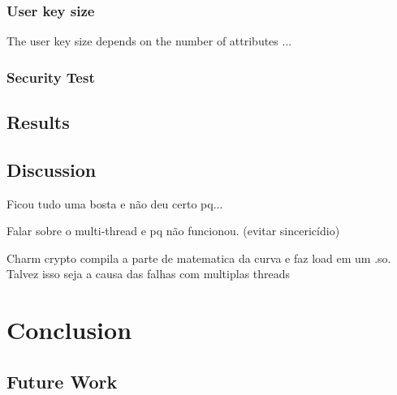\documentclass[cic,tc,english]{iiufrgs}
\begin{document}
        \subsection{User key size}
            \label{sec:keysize}
            The user key size depends on the number of attributes ...


        

        \subsection{Security Test}
            \label{sec:securitytest}

    \section{Results}
        \label{sec:results}

    \section{Discussion}
        \label{sec:discussion}
        Ficou tudo uma bosta e não deu certo pq...

        Falar sobre o multi-thread e pq não funcionou. (evitar sincericídio)

        Charm crypto compila a parte de matematica da curva e faz load em um .so. Talvez isso seja a causa das falhas com multiplas threads


\chapter{Conclusion}
    \label{chap:conclusion}

    \section{Future Work}
        \label{sec:futurework}




\end{document}
